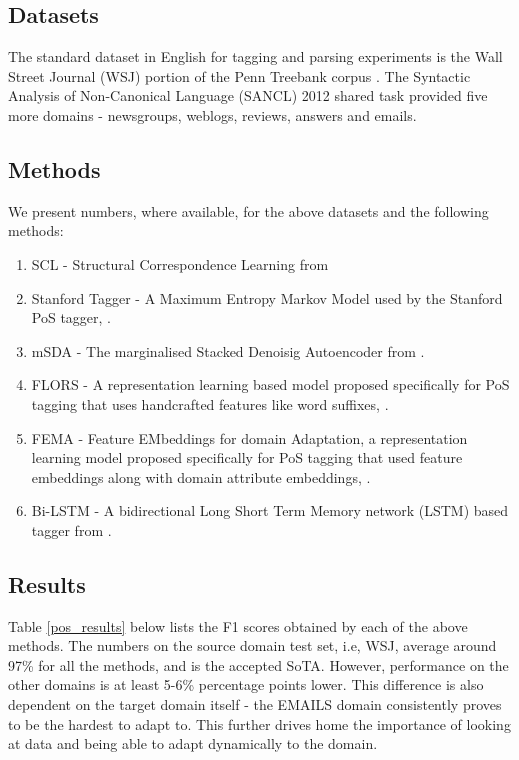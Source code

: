 \documentclass[12pt]{report}
\begin{document}
	\subsection{Datasets}
	The standard dataset in English for tagging and parsing experiments is the Wall Street Journal (WSJ) portion of the Penn Treebank corpus \citep{marcus1993building}. The Syntactic Analysis of Non-Canonical Language (SANCL) 2012 shared task \citep{petrov2012overview} provided five more domains - newsgroups, weblogs, reviews, answers and emails.
	
	\subsection{Methods}
	We present numbers, where available, for the above datasets and the following methods:
	\begin{enumerate}
		\item SCL - Structural Correspondence Learning from \citep{blitzer2006domain}
		\item Stanford Tagger - A Maximum Entropy Markov Model used by the Stanford PoS tagger, \citep{toutanova2000enriching}.
		\item mSDA - The marginalised Stacked Denoisig Autoencoder from \citep{chen2012marginalized}.
		\item FLORS - A representation learning based model proposed specifically for PoS tagging that uses handcrafted features like word suffixes, \citep{schnabel2014flors}.
		\item FEMA - Feature EMbeddings for domain Adaptation, a representation learning model proposed specifically for PoS tagging that used feature embeddings along with domain attribute embeddings, \citep{yang2015unsupervised}.
		\item Bi-LSTM - A bidirectional Long Short Term Memory network (LSTM) based tagger from \citep{plank2016multilingual}.
	\end{enumerate}
	

	
	\subsection{Results}
	\label{pos_res}
	
	Table \ref{pos_results} below lists the F1 scores obtained by each of the above methods. The numbers on the source domain test set, i.e, WSJ, average around 97\% for all the methods, and is the accepted SoTA. However, performance on the other domains is at least 5-6\% percentage points lower. This difference is also dependent on the target domain itself - the EMAILS domain consistently proves to be the hardest to adapt to. This further drives home the importance of looking at data and being able to adapt dynamically to the domain.
	
\end{document}
